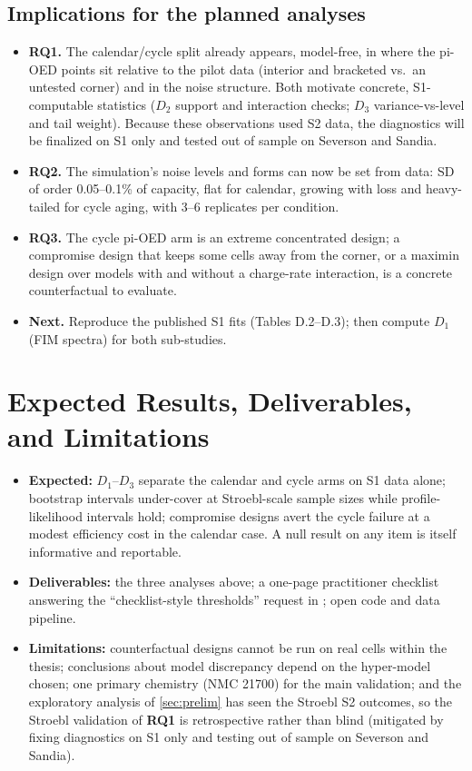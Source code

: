 \documentclass[11pt,letterpaper]{article}
\newcommand{\RQ}[1]{\textbf{RQ#1}}
\begin{document}
\subsection{Implications for the planned analyses}
\begin{itemize}
  \item \textbf{\RQ1.} The calendar/cycle split already appears, model-free, in where the pi-OED points sit relative to the pilot data (interior and bracketed vs.\ an untested corner) and in the noise structure. Both motivate concrete, S1-computable statistics ($D_2$ support and interaction checks; $D_3$ variance-vs-level and tail weight). Because these observations used S2 data, the diagnostics will be finalized on S1 only and tested out of sample on Severson and Sandia.
  \item \textbf{\RQ2.} The simulation's noise levels and forms can now be set from data: SD of order 0.05--0.1\% of capacity, flat for calendar, growing with loss and heavy-tailed for cycle aging, with 3--6 replicates per condition.
  \item \textbf{\RQ3.} The cycle pi-OED arm is an extreme concentrated design; a compromise design that keeps some cells away from the corner, or a maximin design over models with and without a charge-rate interaction, is a concrete counterfactual to evaluate.
  \item \textbf{Next.} Reproduce the published S1 fits (Tables D.2--D.3); then compute $D_1$ (FIM spectra) for both sub-studies.
\end{itemize}

\section{Expected Results, Deliverables, and Limitations}\label{sec:expected}
\begin{itemize}
  \item \textbf{Expected:} $D_1$--$D_3$ separate the calendar and cycle arms on S1 data alone; bootstrap intervals under-cover at Stroebl-scale sample sizes while profile-likelihood intervals hold; compromise designs avert the cycle failure at a modest efficiency cost in the calendar case. A null result on any item is itself informative and reportable.
  \item \textbf{Deliverables:} the three analyses above; a one-page practitioner checklist answering the ``checklist-style thresholds'' request in \cite{stroebl2026}; open code and data pipeline.
  \item \textbf{Limitations:} counterfactual designs cannot be run on real cells within the thesis; conclusions about model discrepancy depend on the hyper-model chosen; one primary chemistry (NMC 21700) for the main validation; and the exploratory analysis of \cref{sec:prelim} has seen the Stroebl S2 outcomes, so the Stroebl validation of \RQ1 is retrospective rather than blind (mitigated by fixing diagnostics on S1 only and testing out of sample on Severson and Sandia).
\end{itemize}
\end{document}
